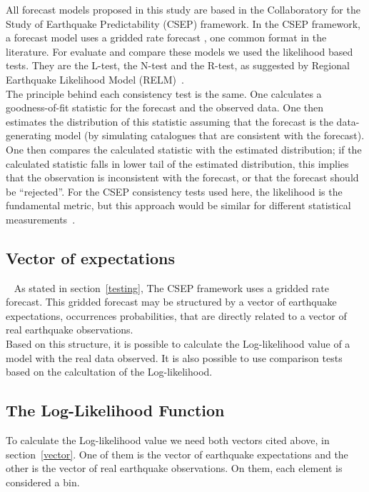 All forecast models proposed in this study are based in the Collaboratory for the Study of Earthquake Predictability (CSEP) framework. In the CSEP framework, a forecast model uses a gridded rate forecast \cite{zechar2010evaluating}, one common format in the literature. For evaluate and compare these models we used the likelihood based tests. They are the L-test, the N-test and the R-test, as suggested by Regional Earthquake Likelihood Model (RELM)~\cite{schorlemmer2007earthquake}.\\

The principle behind each consistency test is the same. One calculates a goodness-of-fit statistic for the forecast and the observed data. One then estimates the distribution of
this statistic assuming that the forecast is the data-generating model (by simulating catalogues that are consistent with the forecast). One then compares the calculated statistic with the estimated distribution; if the calculated statistic falls in lower tail of the estimated distribution, this implies that the observation is inconsistent with the forecast, or that the forecast should be “rejected”. For the CSEP consistency tests used here, the likelihood is the fundamental metric, but this approach would be similar for different statistical measurements~\cite{eberhard2014multiscale}.\\

\subsection{Vector of expectations}~\label{vector}
As stated in section~\ref{testing}, The CSEP framework uses a gridded rate forecast. This gridded forecast may be structured by a vector of earthquake expectations, occurrences probabilities, that are directly related to a vector of real earthquake observations.\\

Based on this structure, it is possible to calculate the Log-likelihood value of a model with the real data observed. It is also possible to use comparison tests based on the calcultation of the Log-likelihood.\\

\subsection{The Log-Likelihood Function}
To calculate the Log-likelihood value we need both vectors cited above, in section~\ref{vector}. One of them is the vector of earthquake expectations and the other is the vector of real earthquake observations. On them, each element is considered a bin. \\

